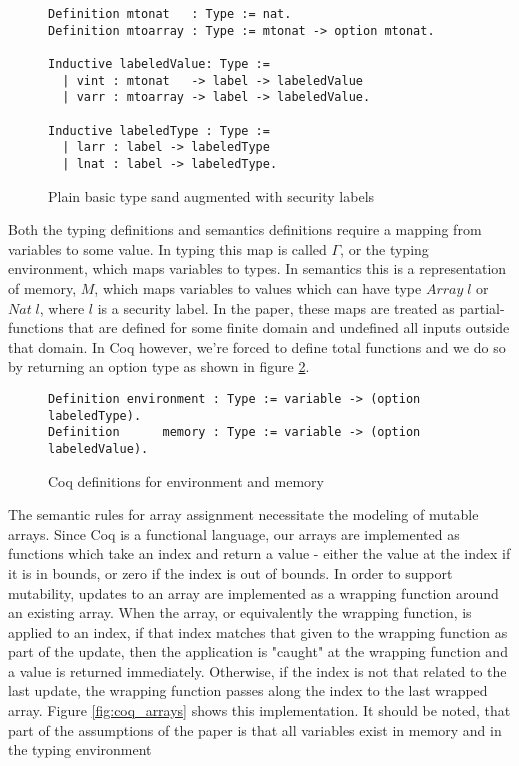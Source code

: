\documentclass[10pt,  onecolumn]{article}
\begin{document}
\begin{figure}
\caption{Plain basic type sand augmented with security labels}
\label{fig:coq_labeled_things}

\begin{lstlisting}
Definition mtonat   : Type := nat.
Definition mtoarray : Type := mtonat -> option mtonat.

Inductive labeledValue: Type :=
  | vint : mtonat   -> label -> labeledValue
  | varr : mtoarray -> label -> labeledValue.

Inductive labeledType : Type :=
  | larr : label -> labeledType
  | lnat : label -> labeledType.
\end{lstlisting}
\end{figure}



Both the typing definitions and semantics definitions require a mapping from variables to some value.
In typing this map is called $\Gamma$, or the typing environment,  which maps variables to types.
In semantics this is a representation of memory, $M$, which maps variables to values which can have type $Array \; l$ or $Nat \; l$, where $l$ is a security label.
In the paper, these maps are treated as partial-functions that are defined for some finite domain and undefined all inputs outside that domain.
In Coq however, we're forced to define total functions and we do so by returning an option type as shown in figure \ref{fig:coq_total_functions}.


\begin{figure}
\caption{ Coq definitions for environment and memory }
\label{fig:coq_total_functions}
\begin{lstlisting}
Definition environment : Type := variable -> (option labeledType).
Definition      memory : Type := variable -> (option labeledValue).
\end{lstlisting}
\end{figure}



The semantic rules for array assignment necessitate the modeling of mutable arrays.
Since Coq is a functional language, our arrays are implemented as functions which take an index and return a value - either the value at the index if it is in bounds, or zero if the index is out of bounds.
In order to support mutability, updates to an array are implemented as a wrapping function around an existing array.
When the array, or equivalently the wrapping function, is applied to an index, if that index matches that given to the wrapping function as part of the update, then the application is "caught" at the wrapping function and a value is returned immediately.
Otherwise, if the index is not that related to the last update, the wrapping function passes along the index to the last wrapped array.
Figure \ref{fig:coq_arrays} shows this implementation.
It should be noted, that part of the assumptions of the paper is that all variables exist in memory and in the typing environment 
\end{document}
